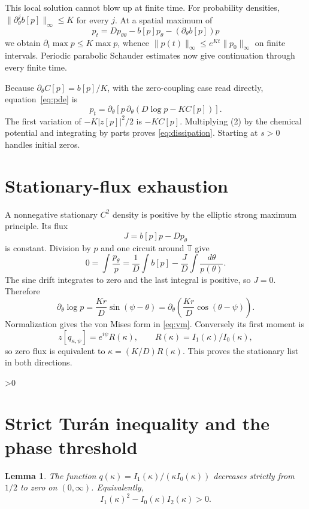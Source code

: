 \documentclass[10pt]{article}
\providecommand{\CRevisionRound}{2}
\newtheorem{lemma}{Lemma}
\theoremstyle{remark}
\newcommand{\Torus}{\mathbb T}
\begin{document}
This local solution cannot blow up at finite time.  For probability
densities, \(\lVert\partial_\theta^j b[p]\rVert_\infty\leq K\) for every
\(j\).  At a spatial maximum of
\[
 p_t=Dp_{\theta\theta}-b[p]p_\theta-(\partial_\theta b[p])p
\]
we obtain \(\partial_t\max p\leq K\max p\), whence
\(\lVert p(t)\rVert_\infty\leq e^{Kt}\lVert p_0\rVert_\infty\) on finite
intervals.  Periodic parabolic Schauder estimates now give continuation
through every finite time.

Because \(\partial_\theta C[p]=b[p]/K\), with the zero-coupling case read
directly, equation~\eqref{eq:pde} is
\[
 p_t=\partial_\theta\left[p\,\partial_\theta
       \left(D\log p-KC[p]\right)\right].                  \tag{2}
\]
The first variation of \(-K|z[p]|^2/2\) is \(-KC[p]\).  Multiplying
(2) by the chemical potential and integrating by parts proves
\eqref{eq:dissipation}.  Starting at \(s>0\) handles initial zeros.

\section{Stationary-flux exhaustion}

A nonnegative stationary \(C^2\) density is positive by the elliptic strong
maximum principle.  Its flux
\[
 J=b[p]p-Dp_\theta
\]
is constant.  Division by \(p\) and one circuit around \(\Torus\) give
\[
 0=\int\frac{p_\theta}{p}
   =\frac1D\int b[p]-\frac JD\int\frac{d\theta}{p(\theta)}.
\]
The sine drift integrates to zero and the last integral is positive, so
\(J=0\).  Therefore
\[
 \partial_\theta\log p=\frac{Kr}{D}\sin(\psi-\theta)
 =\partial_\theta\left(\frac{Kr}{D}\cos(\theta-\psi)\right).
\]
Normalization gives the von Mises form in \eqref{eq:vm}.  Conversely its
first moment is
\[
 z[q_{\kappa,\psi}]=e^{i\psi}R(\kappa),\qquad
 R(\kappa)=I_1(\kappa)/I_0(\kappa),
\]
so zero flux is equivalent to \(\kappa=(K/D)R(\kappa)\).  This proves the
stationary list in both directions.

\ifnum\CRevisionRound>0
\section{Strict Tur\'an inequality and the phase threshold}

\begin{lemma}\label{lem:bessel}
The function \(q(\kappa)=I_1(\kappa)/(\kappa I_0(\kappa))\) decreases
strictly from \(1/2\) to zero on \((0,\infty)\).  Equivalently,
\[
 I_1(\kappa)^2-I_0(\kappa)I_2(\kappa)>0.                  \tag{3}
\]
\end{lemma}
\end{document}
